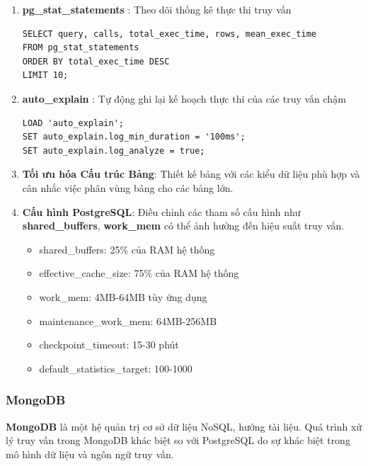 \begin{enumerate}
    \item \textbf{pg\_stat\_statements} : Theo dõi thống kê thực thi truy vấn

\begin{lstlisting}[style=sql, caption=Ví dụ theo dõi thống kê thực thi trong Postgres, label=sql:example]
SELECT query, calls, total_exec_time, rows, mean_exec_time
FROM pg_stat_statements
ORDER BY total_exec_time DESC
LIMIT 10;
\end{lstlisting}

    \item \textbf{auto\_explain} : Tự động ghi lại kế hoạch thực thi của các truy vấn chậm

\begin{lstlisting}[style=sql, caption=Ví dụ theo dõi truy vấn chậm trong Postgres, label=sql:example]
LOAD 'auto_explain';
SET auto_explain.log_min_duration = '100ms';
SET auto_explain.log_analyze = true;
\end{lstlisting}

    
    
    \item \textbf{Tối ưu hóa Cấu trúc Bảng}: Thiết kế bảng với các kiểu dữ liệu phù hợp và cân nhắc việc phân vùng bảng cho các bảng lớn.
    \item \textbf{Cấu hình PostgreSQL}: Điều chỉnh các tham số cấu hình như \textbf{shared\_buffers}, \textbf{work\_mem} có thể ảnh hưởng đến hiệu suất truy vấn.

    \begin{itemize}
        \item shared\_buffers: 25\% của RAM hệ thống
        \item effective\_cache\_size: 75\% của RAM hệ thống
        \item work\_mem: 4MB-64MB tùy ứng dụng
        \item maintenance\_work\_mem: 64MB-256MB
        \item checkpoint\_timeout: 15-30 phút
        \item default\_statistics\_target: 100-1000
    \end{itemize}
    
\end{enumerate}

\subsubsection{MongoDB}

\textbf{MongoDB} là một hệ quản trị cơ sở dữ liệu NoSQL, hướng tài liệu. Quá trình xử lý truy vấn trong MongoDB khác biệt so với PostgreSQL do sự khác biệt trong mô hình dữ liệu và ngôn ngữ truy vấn.

